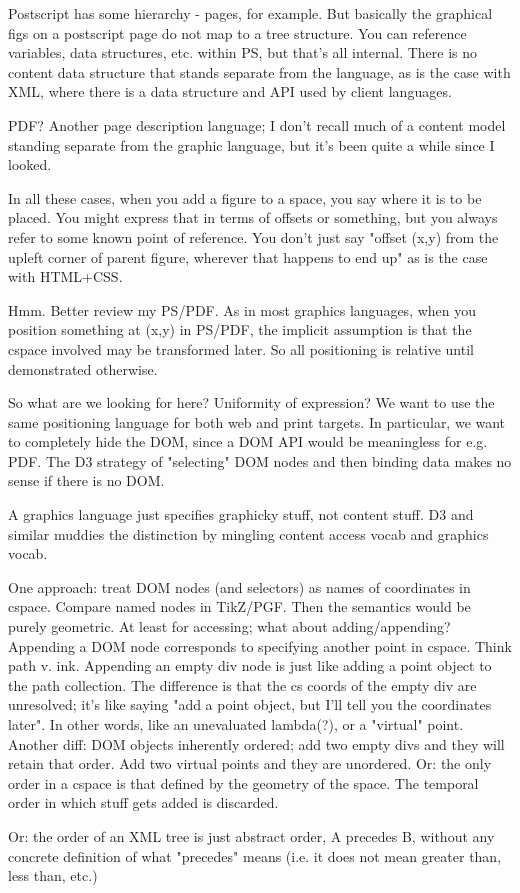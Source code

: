 \documentclass{tufte-handout}
\numberwithin{equation}{subsection}
\begin{document}
Postscript has some hierarchy - pages, for example.  But basically the
graphical figs on a postscript page do not map to a tree structure.
You can reference variables, data structures, etc. within PS, but
that's all internal.  There is no content data structure that stands
separate from the language, as is the case with XML, where there is a
data structure and API used by client languages.

PDF?  Another page description language; I don't recall much of a
content model standing separate from the graphic language, but it's
been quite a while since I looked.

In all these cases, when you add a figure to a space, you say where it
is to be placed.  You might express that in terms of offsets or
something, but you always refer to some known point of reference.  You
don't just say "offset (x,y) from the upleft corner of parent
figure, wherever that happens to end up" as is the case with HTML+CSS.

Hmm.  Better review my PS/PDF.  As in most graphics languages, when
you position something at (x,y) in PS/PDF, the implicit assumption is
that the cspace involved may be transformed later.  So all positioning
is relative until demonstrated otherwise.

So what are we looking for here?  Uniformity of expression?  We want
to use the same positioning language for both web and print targets.
In particular, we want to completely hide the DOM, since a DOM API
would be meaningless for e.g. PDF.  The D3 strategy of "selecting" DOM
nodes and then binding data makes no sense if there is no DOM.

A graphics language just specifies graphicky stuff, not content stuff.
D3 and similar muddies the distinction by mingling content access
vocab and graphics vocab.

One approach: treat DOM nodes (and selectors) as names of coordinates
in cspace.  Compare named nodes in TikZ/PGF.  Then the semantics would
be purely geometric.  At least for accessing; what about
adding/appending?  Appending a DOM node corresponds to specifying
another point in cspace.  Think path v. ink.  Appending an empty div
node is just like adding a point object to the path collection.  The
difference is that the cs coords of the empty div are unresolved; it's
like saying "add a point object, but I'll tell you the coordinates
later".  In other words, like an unevaluated lambda(?), or a "virtual"
point.  Another diff: DOM objects inherently ordered; add two empty
divs and they will retain that order.  Add two virtual points and they
are unordered.  Or: the only order in a cspace is that defined by the
geometry of the space.  The temporal order in which stuff gets added
is discarded.

Or: the order of an XML tree is just abstract order, A precedes B,
without any concrete definition of what "precedes" means (i.e. it does
not mean greater than, less than, etc.)
\end{document}
